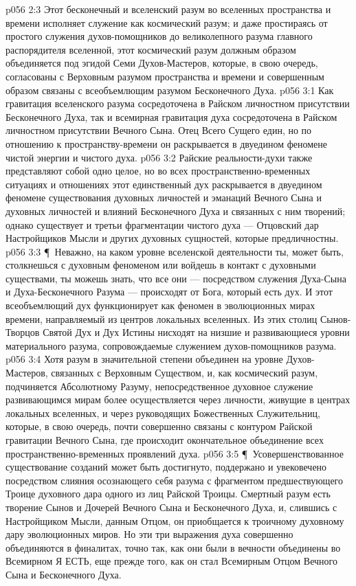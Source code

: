 \vs p056 2:3 Этот бесконечный и вселенский разум во вселенных пространства и времени исполняет служение как космический разум; и даже простираясь от простого служения духов\hyp{}помощников до великолепного разума главного распорядителя вселенной, этот космический разум должным образом объединяется под эгидой Семи Духов\hyp{}Мастеров, которые, в свою очередь, согласованы с Верховным разумом пространства и времени и совершенным образом связаны с всеобъемлющим разумом Бесконечного Духа.
\vs p056 3:1 Как гравитация вселенского разума сосредоточена в Райском личностном присутствии Бесконечного Духа, так и всемирная гравитация духа сосредоточена в Райском личностном присутствии Вечного Сына. Отец Всего Сущего един, но по отношению к пространству\hyp{}времени он раскрывается в двуедином феномене чистой энергии и чистого духа.
\vs p056 3:2 Райские реальности\hyp{}духи также представляют собой одно целое, но во всех пространственно\hyp{}временных ситуациях и отношениях этот единственный дух раскрывается в двуедином феномене существования духовных личностей и эманаций Вечного Сына и духовных личностей и влияний Бесконечного Духа и связанных с ним творений; однако существует и третьи фрагментации чистого духа --- Отцовский дар Настройщиков Мысли и других духовных сущностей, которые предличностны.
\vs p056 3:3 \P\ Неважно, на каком уровне вселенской деятельности ты, может быть, столкнешься с духовным феноменом или войдешь в контакт с духовными существами, ты можешь знать, что все они --- посредством служения Духа\hyp{}Сына и Духа\hyp{}Бесконечного Разума --- происходят от Бога, который есть дух. И этот всеобъемлющий дух функционирует как феномен в эволюционных мирах времени, направляемый из центров локальных вселенных. Из этих столиц Сынов\hyp{}Творцов Святой Дух и Дух Истины нисходят на низшие и развивающиеся уровни материального разума, сопровождаемые служением духов\hyp{}помощников разума.
\vs p056 3:4 Хотя разум в значительной степени объединен на уровне Духов\hyp{}Мастеров, связанных с Верховным Существом, и, как космический разум, подчиняется Абсолютному Разуму, непосредственное духовное служение развивающимся мирам более осуществляется через личности, живущие в центрах локальных вселенных, и через руководящих Божественных Служительниц, которые, в свою очередь, почти совершенно связаны с контуром Райской гравитации Вечного Сына, где происходит окончательное объединение всех пространственно\hyp{}временных проявлений духа.
\vs p056 3:5 \P\ Усовершенствованное существование созданий может быть достигнуто, поддержано и увековечено посредством слияния осознающего себя разума с фрагментом предшествующего Троице духовного дара одного из лиц Райской Троицы. Смертный разум есть творение Сынов и Дочерей Вечного Сына и Бесконечного Духа, и, слившись с Настройщиком Мысли, данным Отцом, он приобщается к троичному духовному дару эволюционных миров. Но эти три выражения духа совершенно объединяются в финалитах, точно так, как они были в вечности объединены во Всемирном Я ЕСТЬ, еще прежде того, как он стал Всемирным Отцом Вечного Сына и Бесконечного Духа.
